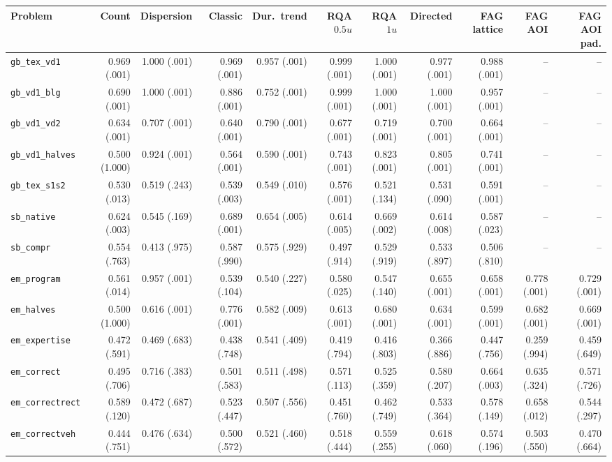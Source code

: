 \begin{tabular}{lrrrrrrrrrr}
\toprule
Problem & Count & Dispersion & Classic & Dur.\ trend & RQA $0.5u$ & RQA $1u$ & Directed & FAG lattice & FAG AOI & FAG AOI pad. \\
\midrule
\texttt{gb\_tex\_vd1} & 0.969 (.001) & 1.000 (.001) & 0.969 (.001) & 0.957 (.001) & 0.999 (.001) & 1.000 (.001) & 0.977 (.001) & 0.988 (.001) & -- & -- \\
\texttt{gb\_vd1\_blg} & 0.690 (.001) & 1.000 (.001) & 0.886 (.001) & 0.752 (.001) & 0.999 (.001) & 1.000 (.001) & 1.000 (.001) & 0.957 (.001) & -- & -- \\
\texttt{gb\_vd1\_vd2} & 0.634 (.001) & 0.707 (.001) & 0.640 (.001) & 0.790 (.001) & 0.677 (.001) & 0.719 (.001) & 0.700 (.001) & 0.664 (.001) & -- & -- \\
\texttt{gb\_vd1\_halves} & 0.500 (1.000) & 0.924 (.001) & 0.564 (.001) & 0.590 (.001) & 0.743 (.001) & 0.823 (.001) & 0.805 (.001) & 0.741 (.001) & -- & -- \\
\texttt{gb\_tex\_s1s2} & 0.530 (.013) & 0.519 (.243) & 0.539 (.003) & 0.549 (.010) & 0.576 (.001) & 0.521 (.134) & 0.531 (.090) & 0.591 (.001) & -- & -- \\
\texttt{sb\_native} & 0.624 (.003) & 0.545 (.169) & 0.689 (.001) & 0.654 (.005) & 0.614 (.005) & 0.669 (.002) & 0.614 (.008) & 0.587 (.023) & -- & -- \\
\texttt{sb\_compr} & 0.554 (.763) & 0.413 (.975) & 0.587 (.990) & 0.575 (.929) & 0.497 (.914) & 0.529 (.919) & 0.533 (.897) & 0.506 (.810) & -- & -- \\
\texttt{em\_program} & 0.561 (.014) & 0.957 (.001) & 0.539 (.104) & 0.540 (.227) & 0.580 (.025) & 0.547 (.140) & 0.655 (.001) & 0.658 (.001) & 0.778 (.001) & 0.729 (.001) \\
\texttt{em\_halves} & 0.500 (1.000) & 0.616 (.001) & 0.776 (.001) & 0.582 (.009) & 0.613 (.001) & 0.680 (.001) & 0.634 (.001) & 0.599 (.001) & 0.682 (.001) & 0.669 (.001) \\
\texttt{em\_expertise} & 0.472 (.591) & 0.469 (.683) & 0.438 (.748) & 0.541 (.409) & 0.419 (.794) & 0.416 (.803) & 0.366 (.886) & 0.447 (.756) & 0.259 (.994) & 0.459 (.649) \\
\texttt{em\_correct} & 0.495 (.706) & 0.716 (.383) & 0.501 (.583) & 0.511 (.498) & 0.571 (.113) & 0.525 (.359) & 0.580 (.207) & 0.664 (.003) & 0.635 (.324) & 0.571 (.726) \\
\texttt{em\_correctrect} & 0.589 (.120) & 0.472 (.687) & 0.523 (.447) & 0.507 (.556) & 0.451 (.760) & 0.462 (.749) & 0.533 (.364) & 0.578 (.149) & 0.658 (.012) & 0.544 (.297) \\
\texttt{em\_correctveh} & 0.444 (.751) & 0.476 (.634) & 0.500 (.572) & 0.521 (.460) & 0.518 (.444) & 0.559 (.255) & 0.618 (.060) & 0.574 (.196) & 0.503 (.550) & 0.470 (.664) \\
\bottomrule
\end{tabular}
